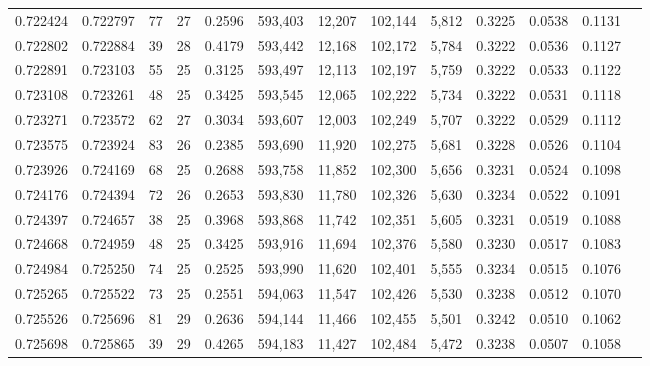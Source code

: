 \begin{tabular}{rrrrrrrrrrrrr}
0.722424 & 0.722797 &  77 &  27 &                                     0.2596 & 593,403 &  12,207 & 102,144 &   5,812 & 0.3225 & 0.0538 & 0.1131 \\
0.722802 & 0.722884 &  39 &  28 &                                     0.4179 & 593,442 &  12,168 & 102,172 &   5,784 & 0.3222 & 0.0536 & 0.1127 \\
0.722891 & 0.723103 &  55 &  25 &                                     0.3125 & 593,497 &  12,113 & 102,197 &   5,759 & 0.3222 & 0.0533 & 0.1122 \\
0.723108 & 0.723261 &  48 &  25 &                                     0.3425 & 593,545 &  12,065 & 102,222 &   5,734 & 0.3222 & 0.0531 & 0.1118 \\
0.723271 & 0.723572 &  62 &  27 &                                     0.3034 & 593,607 &  12,003 & 102,249 &   5,707 & 0.3222 & 0.0529 & 0.1112 \\
0.723575 & 0.723924 &  83 &  26 &                                     0.2385 & 593,690 &  11,920 & 102,275 &   5,681 & 0.3228 & 0.0526 & 0.1104 \\
0.723926 & 0.724169 &  68 &  25 &                                     0.2688 & 593,758 &  11,852 & 102,300 &   5,656 & 0.3231 & 0.0524 & 0.1098 \\
0.724176 & 0.724394 &  72 &  26 &                                     0.2653 & 593,830 &  11,780 & 102,326 &   5,630 & 0.3234 & 0.0522 & 0.1091 \\
0.724397 & 0.724657 &  38 &  25 &                                     0.3968 & 593,868 &  11,742 & 102,351 &   5,605 & 0.3231 & 0.0519 & 0.1088 \\
0.724668 & 0.724959 &  48 &  25 &                                     0.3425 & 593,916 &  11,694 & 102,376 &   5,580 & 0.3230 & 0.0517 & 0.1083 \\
0.724984 & 0.725250 &  74 &  25 &                                     0.2525 & 593,990 &  11,620 & 102,401 &   5,555 & 0.3234 & 0.0515 & 0.1076 \\
0.725265 & 0.725522 &  73 &  25 &                                     0.2551 & 594,063 &  11,547 & 102,426 &   5,530 & 0.3238 & 0.0512 & 0.1070 \\
0.725526 & 0.725696 &  81 &  29 &                                     0.2636 & 594,144 &  11,466 & 102,455 &   5,501 & 0.3242 & 0.0510 & 0.1062 \\
0.725698 & 0.725865 &  39 &  29 &                                     0.4265 & 594,183 &  11,427 & 102,484 &   5,472 & 0.3238 & 0.0507 & 0.1058 \\

\end{tabular}
